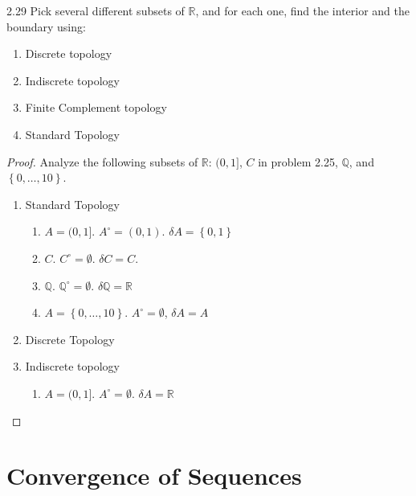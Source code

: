 \documentclass{article}
\newcommand{\R}{\mathbb{R}}
\newcommand{\Q}{\mathbb{Q}}
\begin{document}
\begin{PROB}{2.29}\label{Problem 2.29.}
    Pick several different subsets of $\R$, and for each one, find the interior and the boundary using:

    \begin{enumerate}
        \item Discrete topology
        \item Indiscrete topology
        \item Finite Complement topology
        \item Standard Topology
    \end{enumerate}
\end{PROB}
\begin{proof}
    Analyze the following subsets of $\R$: $(0, 1]$, $C$ in problem 2.25, $\Q$, and $\left\{ 0, \dots, 10 \right\}$. 


    \begin{enumerate}
        \item Standard Topology
        \begin{enumerate}
            \item $A = (0, 1]$. $A^\circ = (0, 1)$. $\delta A = \left\{ 0, 1 \right\}$ 
            \item $C$. $C^\circ = \emptyset$. $\delta C = C$. 
            \item $\Q$. $\Q^\circ = \emptyset$. $\delta \Q = \R$
            \item $A = \left\{ 0, \dots, 10 \right\}$. $A^\circ = \emptyset$, $\delta A = A$           
        \end{enumerate}
        \item Discrete Topology

        \item Indiscrete topology
        \begin{enumerate}
            \item $A = (0, 1]$. $A^\circ = \emptyset$. $\delta A = \R$
                
        \end{enumerate}
    \end{enumerate}
    
    
\end{proof}

\pagebreak

\section*{Convergence of Sequences}
\end{document}
